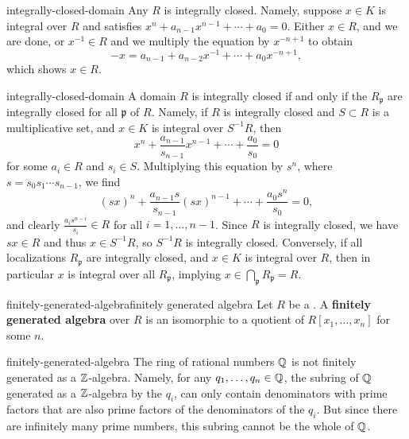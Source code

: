 \begin{example}{integrally-closed-domain}
    Any  $R$ is integrally closed. Namely, suppose $x \in K$ is integral over $R$ and satisfies $x^n + a_{n - 1} x^{n - 1} + \cdots + a_0 = 0$. Either $x \in R$, and we are done, or $x^{-1} \in R$ and we multiply the equation by $x^{-n + 1}$ to obtain
    \[ -x = a_{n - 1} + a_{n - 2} x^{-1} + \cdots + a_0 x^{-n + 1} , \]
    which shows $x \in R$.
\end{example}

\begin{example}{integrally-closed-domain}
    A domain $R$ is integrally closed if and only if the  $R_\mathfrak{p}$ are integrally closed for all  $\mathfrak{p}$ of $R$. Namely, if $R$ is integrally closed and $S \subset R$ is a multiplicative set, and $x \in K$ is integral over $S^{-1} R$, then
    \[ x^n + \frac{a_{n - 1}}{s_{n - 1}} x^{n - 1} + \cdots + \frac{a_0}{s_0} = 0 \]
    for some $a_i \in R$ and $s_i \in S$. Multiplying this equation by $s^n$, where $s = s_0 s_1 \cdots s_{n - 1}$, we find
    \[ (sx)^n + \frac{a_{n - 1} s}{s_{n - 1}} (sx)^{n - 1} + \cdots + \frac{a_0 s^n}{s_0} = 0 , \]
    and clearly $\frac{a_i s^{n - i}}{s_i} \in R$ for all $i = 1, \ldots, n - 1$. Since $R$ is integrally closed, we have $sx \in R$ and thus $x \in S^{-1} R$, so $S^{-1} R$ is integrally closed. Conversely, if all localizations $R_\mathfrak{p}$ are integrally closed, and $x \in K$ is integral over $R$, then in particular $x$ is integral over all $R_\mathfrak{p}$, implying $x \in \bigcap_{\mathfrak{p}} R_\mathfrak{p} = R$.
\end{example}

\begin{topic}{finitely-generated-algebra}{finitely generated algebra}
    Let $R$ be a . A \textbf{finitely generated algebra} over $R$ is an  isomorphic to a quotient of $R[x_1, \ldots, x_n]$ for some $n$.
\end{topic}

\begin{example}{finitely-generated-algebra}
    The ring of rational numbers $\mathbb{Q}$ is not finitely generated as a $\mathbb{Z}$-algebra. Namely, for any $q_1, \ldots, q_n \in \mathbb{Q}$, the subring of $\mathbb{Q}$ generated as a $\mathbb{Z}$-algebra by the $q_i$, can only contain denominators with prime factors that are also prime factors of the denominators of the $q_i$. But since there are infinitely many prime numbers, this subring cannot be the whole of $\mathbb{Q}$.
\end{example}


